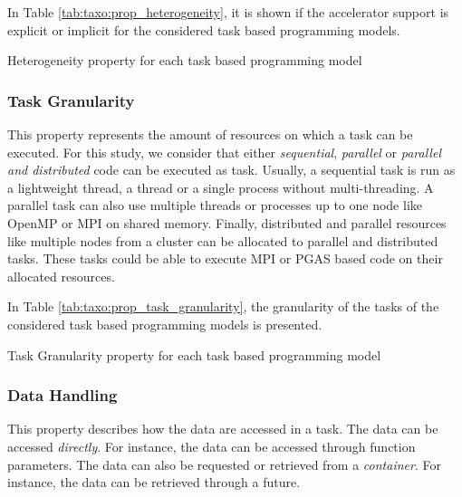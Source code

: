 In Table \ref{tab:taxo:prop_heterogeneity}, it is shown if the accelerator support is explicit or implicit for the considered task based programming models.

\begin{table}[H]
	\caption{Heterogeneity property for each task based programming model \label{tab:taxo:prop_heterogeneity}}
	\centering
	\begin{multicols}{2}
		

		
	\end{multicols}
\end{table}

\subsubsection{Task Granularity}
This property represents the amount of resources on which a task can be executed.
For this study, we consider that either \textit{sequential}, \textit{parallel} or \textit{parallel and distributed} code can be executed as task.
Usually, a sequential task is run as a lightweight thread, a thread or a single process without multi-threading.
A parallel task can also use multiple threads or processes up to one node like OpenMP or MPI on shared memory.
Finally, distributed and parallel resources like multiple nodes from a cluster can be allocated to parallel and distributed tasks.
These tasks could be able to execute MPI or PGAS based code on their allocated resources.

In Table \ref{tab:taxo:prop_task_granularity}, the granularity of the tasks of the considered task based programming models is presented.

\begin{table}[H]
	\caption{Task Granularity property for each task based programming model \label{tab:taxo:prop_task_granularity}}
	\centering
	\begin{multicols}{2}
		

		
	\end{multicols}
\end{table}

\subsubsection{Data Handling}
This property describes how the data are accessed in a task.
The data can be accessed \textit{directly}.
For instance, the data can be accessed through function parameters.
The data can also be requested or retrieved from a \textit{container}.
For instance, the data can be retrieved through a future.


